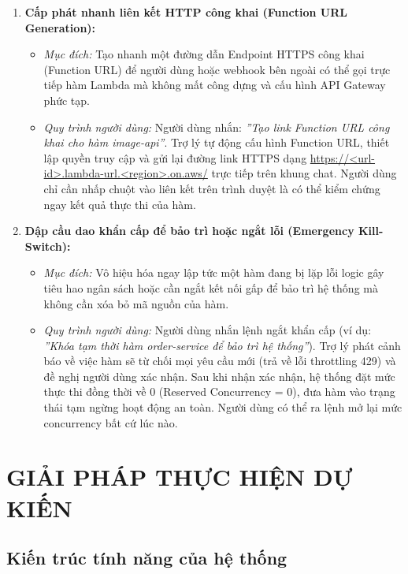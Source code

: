 \documentclass[a4paper,12pt]{article}
\begin{document}
\begin{enumerate}
  \item \textbf{Cấp phát nhanh liên kết HTTP công khai (Function URL Generation):}
  \begin{itemize}
    \item \textit{Mục đích:} Tạo nhanh một đường dẫn Endpoint HTTPS công khai (Function URL) để người dùng hoặc webhook bên ngoài có thể gọi trực tiếp hàm Lambda mà không mất công dựng và cấu hình API Gateway phức tạp.
    \item \textit{Quy trình người dùng:} Người dùng nhắn: \textit{''Tạo link Function URL công khai cho hàm image-api''}. Trợ lý tự động cấu hình Function URL, thiết lập quyền truy cập và gửi lại đường link HTTPS dạng \url{https://<url-id>.lambda-url.<region>.on.aws/} trực tiếp trên khung chat. Người dùng chỉ cần nhấp chuột vào liên kết trên trình duyệt là có thể kiểm chứng ngay kết quả thực thi của hàm.
  \end{itemize}

  \item \textbf{Dập cầu dao khẩn cấp để bảo trì hoặc ngắt lỗi (Emergency Kill-Switch):}
  \begin{itemize}
    \item \textit{Mục đích:} Vô hiệu hóa ngay lập tức một hàm đang bị lặp lỗi logic gây tiêu hao ngân sách hoặc cần ngắt kết nối gấp để bảo trì hệ thống mà không cần xóa bỏ mã nguồn của hàm.
    \item \textit{Quy trình người dùng:} Người dùng nhắn lệnh ngắt khẩn cấp (ví dụ: \textit{''Khóa tạm thời hàm order-service để bảo trì hệ thống''}). Trợ lý phát cảnh báo về việc hàm sẽ từ chối mọi yêu cầu mới (trả về lỗi throttling 429) và đề nghị người dùng xác nhận. Sau khi nhận xác nhận, hệ thống đặt mức thực thi đồng thời về 0 (Reserved Concurrency = 0), đưa hàm vào trạng thái tạm ngừng hoạt động an toàn. Người dùng có thể ra lệnh mở lại mức concurrency bất cứ lúc nào.
  \end{itemize}
\end{enumerate}

\clearpage

\section{GIẢI PHÁP THỰC HIỆN DỰ KIẾN}

\subsection{Kiến trúc tính năng của hệ thống}
\end{document}
